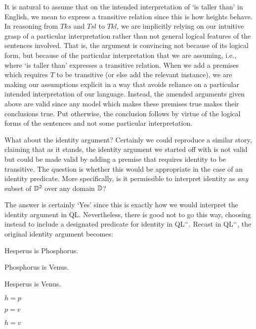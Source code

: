 It is natural to assume that on the intended interpretation of `is taller than' in English, we mean to express a transitive relation since this is how heights behave.
In reasoning from $Tks$ and $Tsl$ to $Tkl$, we are implicitly relying on our intuitive grasp of a particular interpretation rather than not general logical features of the sentences involved. 
That is, the argument is convincing not because of its logical form, but because of the particular interpretation that we are assuming, i.e., where `is taller than' expresses a transitive relation.
When we add a premises which requires $T$ to be transitive (or else add the relevant instance), we are making our assumptions explicit in a way that avoids reliance on a particular intended interpretation of our language.
Instead, the amended arguments given above are valid since any model which makes these premises true makes their conclusions true. 
Put otherwise, the conclusion follows by virtue of the logical forms of the sentences and not some particular interpretation.

What about the identity argument?
Certainly we could reproduce a similar story, claiming that as it stands, the identity argument we started off with is not valid but could be made valid by adding a premise that requires identity to be transitive.
The question is whether this would be appropriate in the case of an identity predicate.
More specifically, is it permissible to interpret identity as \textit{any} subset of $\mathbb{D}^2$ over any domain $\mathbb{D}$?

The answer is certainly `Yes' since this is exactly how we would interpret the identity argument in QL.
Nevertheless, there is good not to go this way, choosing instead to include a designated predicate for identity in QL$^=$.
Recast in QL$^=$, the original identity argument becomes:

\begin{multicols}{2}
  
\begin{earg}
  \item[] Hesperus is Phosphorus.
  \item[] Phosphorus is Venus.
  \item[\therefore] Hesperus is Venus.
\end{earg}

\begin{earg}
  \item[] $h=p$
  \item[] $p=v$
  \item[\therefore] $h=v$
\end{earg}

\end{multicols}

